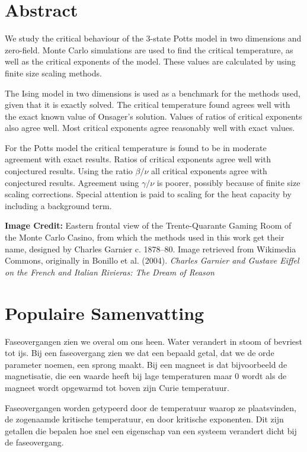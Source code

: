 \documentclass[11pt, a4paper]{report} %
\begin{document}
\thispagestyle{plain}
\section*{Abstract}

We study the critical behaviour of the 3-state Potts model in two dimensions and zero-field.
Monte Carlo simulations are used to find the critical temperature, as well as the critical exponents of the model.
These values are calculated by using finite size scaling methods.

The Ising model in two dimensions is used as a benchmark for the methods used, given that it is exactly solved.
The critical temperature found agrees well with the exact known value of Onsager's solution.
Values of ratios of critical exponents also agree well.
Most critical exponents agree reasonably well with exact values.

For the Potts model the critical temperature is found to be in moderate agreement with exact results.
Ratios of critical exponents agree well with conjectured results.
Using the ratio \(\beta/\nu\) all critical exponents agree with conjectured results.
Agreement using \(\gamma/\nu\) is poorer, possibly because of finite size scaling corrections.
Special attention is paid to scaling for the heat capacity by including a background term.

\vfill
\noindent
\textbf{Image Credit:} Eastern frontal view of the Trente-Quarante Gaming Room of the Monte Carlo Casino, from which the methods used in this work get their name, designed by Charles Garnier c. 1878–80. Image retrieved from Wikimedia Commons, originally in Bonillo et al. (2004). \textit{Charles Garnier and Gustave Eiffel on the French and Italian Rivieras: The Dream of Reason}


\newpage
\thispagestyle{plain}
\section*{Populaire Samenvatting}
Faseovergangen zien we overal om ons heen. Water verandert in stoom of bevriest tot ijs.
Bij een faseovergang zien we dat een bepaald getal, dat we de orde parameter noemen, een sprong maakt.
Bij een magneet is dat bijvoorbeeld de magnetisatie, die een waarde heeft bij lage temperaturen maar 0 wordt als de magneet wordt opgewarmd tot boven zijn Curie temperatuur.

Faseovergangen worden getypeerd door de temperatuur waarop ze plaatsvinden, de zogenaamde kritische temperatuur, en door kritische exponenten.
Dit zijn getallen die bepalen hoe snel een eigenschap van een systeem verandert dicht bij de faseovergang.
\end{document}
